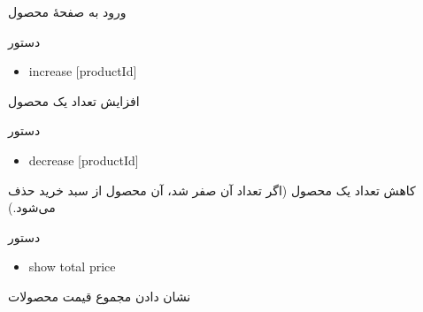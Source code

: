 \documentclass[]{article}
\begin{document}
ورود به صفحهٔ محصول


\begin{mybox}[colback=brilliantlavender]{دستور}

\begin{latin}

\begin{itemize}[label = {$\Rightarrow$}]

\item
increase [productId]

\end{itemize}

\end{latin}

\end{mybox}

افزایش تعداد یک محصول



\begin{mybox}[colback=brilliantlavender]{دستور}

\begin{latin}

\begin{itemize}[label = {$\Rightarrow$}]

\item
decrease [productId]

\end{itemize}

\end{latin}

\end{mybox}

کاهش تعداد یک محصول (اگر تعداد آن صفر شد،‌ آن محصول از سبد خرید حذف می‌شود.)




\begin{mybox}[colback=brilliantlavender]{دستور}

\begin{latin}

\begin{itemize}[label = {$\Rightarrow$}]

\item
show total price

\end{itemize}

\end{latin}

\end{mybox}

نشان دادن مجموع قیمت محصولات
\end{document}
